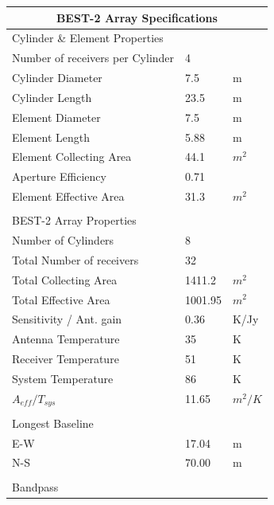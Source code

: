 \documentclass[useAMS,macros,usenatbib,onecolumn]{mn2e}
\begin{document}
\begin{table}
\begin{center}
\begin{tabular}{| l | l | l |}
\hline
\multicolumn{3}{|c|}{BEST-2 Array Specifications}\\
\hline
Cylinder \& Element Properties & &\\
\hline
Number of receivers per Cylinder 	&          4 &            	\\
Cylinder Diameter 		&        7.5 &          m 	\\
Cylinder Length 		&       23.5 &          m 	\\
Element Diameter 		&        7.5 &          m 	\\
Element Length 			&       5.88 &          m 	\\
Element Collecting Area 	&       44.1 &        $m^2$ 	\\
Aperture Efficiency 		&       0.71 &            	\\
Element Effective Area 		&       31.3 &        $m^2$ 	\\
				&            &            	\\
\hline
BEST-2 Array Properties		&            &            	\\
\hline
Number of Cylinders 		&          8 &            	\\
Total Number of receivers 		&         32 &            	\\
Total Collecting Area 		&     1411.2 &        $m^2$ 	\\
Total Effective Area 		&    1001.95 &        $m^2$ 	\\
Sensitivity / Ant. gain 	&       0.36 &       K/Jy 	\\
Antenna Temperature 		&         35 &          K 	\\
Receiver Temperature 		&         51 &          K 	\\
System Temperature  		&         86 &          K 	\\
$A_{eff}/T_{sys}$ 		&      11.65 &      $m^2/K$ 	\\
				&            &            	\\
\hline
Longest Baseline 		&            &            	\\
\hline
E-W 				&      17.04 &         m 	\\
N-S 				&      70.00 &         m 	\\
				&            &            	\\
\hline
Bandpass        		&            &       		\\

\end{tabular}
\end{center}
\end{table}
\end{document}
